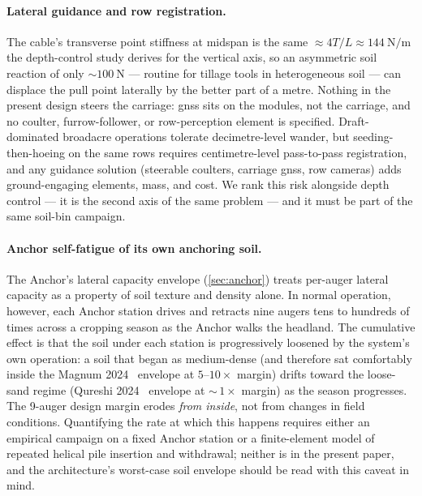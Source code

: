 \documentclass[11pt,a4paper]{article}
\begin{document}
\paragraph{Lateral guidance and row registration.} The cable's transverse point stiffness at midspan is the same ${\approx}4T/L \approx \SI{144}{\newton\per\meter}$ the depth-control study derives for the vertical axis, so an asymmetric soil reaction of only ${\sim}\SI{100}{\newton}$ --- routine for tillage tools in heterogeneous soil --- can displace the pull point laterally by the better part of a metre. Nothing in the present design steers the carriage: \gls{gnss} sits on the modules, not the carriage, and no coulter, furrow-follower, or row-perception element is specified. Draft-dominated broadacre operations tolerate decimetre-level wander, but seeding-then-hoeing on the same rows requires centimetre-level pass-to-pass registration, and any guidance solution (steerable coulters, carriage \gls{gnss}, row cameras) adds ground-engaging elements, mass, and cost. We rank this risk alongside depth control --- it is the second axis of the same problem --- and it must be part of the same soil-bin campaign.

\paragraph{Anchor self-fatigue of its own anchoring soil.} The Anchor's lateral capacity envelope (\cref{sec:anchor}) treats per-auger lateral capacity as a property of soil texture and density alone. In normal operation, however, each Anchor station drives and retracts nine augers tens to hundreds of times across a cropping season as the Anchor walks the headland. The cumulative effect is that the soil under each station is progressively loosened by the system's own operation: a soil that began as medium-dense (and therefore sat comfortably inside the Magnum 2024~\cite{magnum2024fixed} envelope at $5$--$10\times$ margin) drifts toward the loose-sand regime (Qureshi 2024~\cite{khand2024helical} envelope at ${\sim}\,1\times$ margin) as the season progresses. The 9-auger design margin erodes \emph{from inside}, not from changes in field conditions. Quantifying the rate at which this happens requires either an empirical campaign on a fixed Anchor station or a finite-element model of repeated helical pile insertion and withdrawal; neither is in the present paper, and the architecture's worst-case soil envelope should be read with this caveat in mind.
\end{document}
